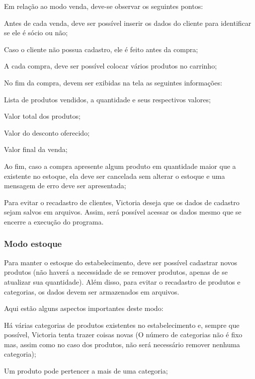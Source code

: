 Em relação ao modo venda, deve-\/se observar os seguintes pontos\+:
\begin{DoxyItemize}
\item Antes de cada venda, deve ser possível inserir os dados do cliente para identificar se ele é sócio ou não;
\item Caso o cliente não possua cadastro, ele é feito antes da compra;
\item A cada compra, deve ser possível colocar vários produtos no carrinho;
\item No fim da compra, devem ser exibidas na tela as seguintes informações\+:
\begin{DoxyItemize}
\item Lista de produtos vendidos, a quantidade e seus respectivos valores;
\item Valor total dos produtos;
\item Valor do desconto oferecido;
\item Valor final da venda;
\end{DoxyItemize}
\item Ao fim, caso a compra apresente algum produto em quantidade maior que a existente no estoque, ela deve ser cancelada sem alterar o estoque e uma mensagem de erro deve ser apresentada;
\end{DoxyItemize}

Para evitar o recadastro de clientes, Victoria deseja que os dados de cadastro sejam salvos em arquivos. Assim, será possível acessar os dados mesmo que se encerre a execução do programa.

\subsubsection*{Modo estoque}

Para manter o estoque do estabelecimento, deve ser possível cadastrar novos produtos (não haverá a necessidade de se remover produtos, apenas de se atualizar sua quantidade). Além disso, para evitar o recadastro de produtos e categorias, os dados devem ser armazenados em arquivos.

Aqui estão alguns aspectos importantes deste modo\+:
\begin{DoxyItemize}
\item Há várias categorias de produtos existentes no estabelecimento e, sempre que possível, Victoria tenta trazer coisas novas (O número de categorias não é fixo mas, assim como no caso dos produtos, não será necessário remover nenhuma categoria);
\item Um produto pode pertencer a mais de uma categoria;
\end{DoxyItemize}

